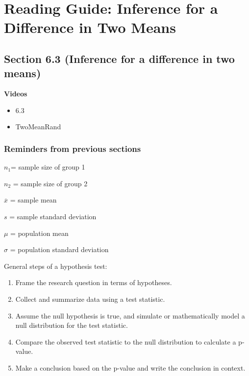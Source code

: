 \documentclass[
]{report}
\providecommand{\tightlist}{%
  \setlength{\itemsep}{0pt}\setlength{\parskip}{0pt}}
\begin{document}
\hypertarget{reading-guide-inference-for-a-difference-in-two-means}{%
\section{Reading Guide: Inference for a Difference in Two Means}\label{reading-guide-inference-for-a-difference-in-two-means}}

\hypertarget{section-6.3-inference-for-a-difference-in-two-means}{%
\subsection*{Section 6.3 (Inference for a difference in two means)}\label{section-6.3-inference-for-a-difference-in-two-means}}

\textbf{Videos}

\begin{itemize}
\tightlist
\item
  6.3
\item
  TwoMeanRand
\end{itemize}


\hypertarget{reminders-from-previous-sections-8}{%
\subsubsection*{Reminders from previous sections}\label{reminders-from-previous-sections-8}}

\(n_1\)= sample size of group 1

\(n_2\) = sample size of group 2

\(\overline{x}\) = sample mean

\(s\) = sample standard deviation

\(\mu\) = population mean

\(\sigma\) = population standard deviation

General steps of a hypothesis test:

\begin{enumerate}
\def\labelenumi{\arabic{enumi}.}
\item
  Frame the research question in terms of hypotheses.
\item
  Collect and summarize data using a test statistic.
\item
  Assume the null hypothesis is true, and simulate or mathematically model a null distribution for the test statistic.
\item
  Compare the observed test statistic to the null distribution to calculate a p-value.
\item
  Make a conclusion based on the p-value and write the conclusion in context.
\end{enumerate}
\end{document}
